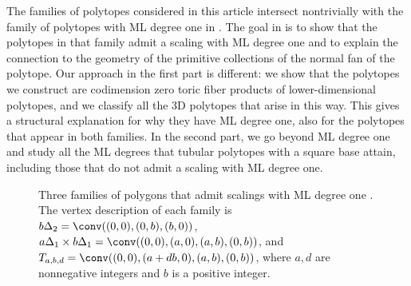 \documentclass[12pt,reqno]{amsart}   	%
\theoremstyle{plain}
\theoremstyle{definition}
\theoremstyle{remark}
\begin{document}
The families of polytopes considered in this article intersect nontrivially with the
family of polytopes with ML degree one in \cite[Section~3]{davies2023}. The goal in
\cite{davies2023} is to show that the polytopes in that family admit a scaling with
ML degree one and to explain the connection to the geometry of the primitive collections of the normal fan of the polytope. Our approach in the first part is different: we show that the polytopes
we construct are codimension zero toric fiber products of lower-dimensional polytopes,
and we classify all the 3D polytopes that arise in this way. This gives a structural
explanation for why they have ML degree one, also for the polytopes that appear in both
families. In the second part, we go beyond ML degree one and study all the ML degrees
that tubular polytopes with a square base attain, including those that do not admit a
scaling with ML degree one.
\begin{figure}
    \centering

 \caption{Three families of polygons that admit scalings with ML degree one \cite{davies2023}.
 The vertex description of each family is $b\Delta_2=\conv((0,0),(0,b),(b,0))$, $a\Delta_1\times b\Delta_1=\conv((0,0),(a,0),(a,b),(0,b))$,  and $T_{a,b,d}=\conv((0,0),(a+db,0),(a,b),(0,b))$, where $a,d$ are nonnegative integers and $b$ is a positive integer.}
    \label{fig:2Dmldegree-one}
\end{figure}
\end{document}
